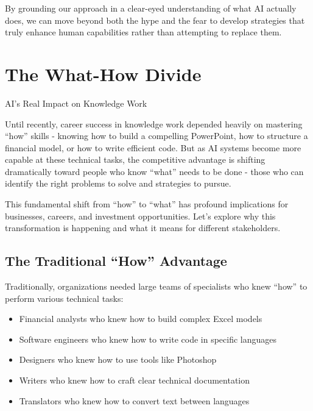 \documentclass[
  Letterpaper,
]{scrbook}
\providecommand{\tightlist}{%
  \setlength{\itemsep}{0pt}\setlength{\parskip}{0pt}}\usepackage{longtable,booktabs,array}
\begin{document}
By grounding our approach in a clear-eyed understanding of what AI
actually does, we can move beyond both the hype and the fear to develop
strategies that truly enhance human capabilities rather than attempting
to replace them.


\chapter{The What-How Divide}\label{the-what-how-divide}

AI's Real Impact on Knowledge Work

\hfill\break

Until recently, career success in knowledge work depended heavily on
mastering ``how'' skills - knowing how to build a compelling PowerPoint,
how to structure a financial model, or how to write efficient code. But
as AI systems become more capable at these technical tasks, the
competitive advantage is shifting dramatically toward people who know
``what'' needs to be done - those who can identify the right problems to
solve and strategies to pursue.

This fundamental shift from ``how'' to ``what'' has profound
implications for businesses, careers, and investment opportunities.
Let's explore why this transformation is happening and what it means for
different stakeholders.

\section{The Traditional ``How''
Advantage}\label{the-traditional-how-advantage}

Traditionally, organizations needed large teams of specialists who knew
``how'' to perform various technical tasks:

\begin{itemize}
\tightlist
\item
  Financial analysts who knew how to build complex Excel models
\item
  Software engineers who knew how to write code in specific languages
\item
  Designers who knew how to use tools like Photoshop
\item
  Writers who knew how to craft clear technical documentation
\item
  Translators who knew how to convert text between languages
\end{itemize}
\end{document}
